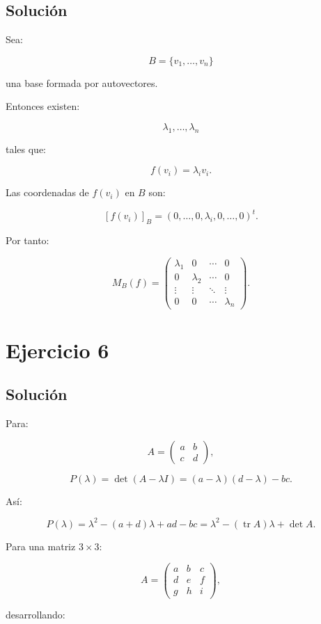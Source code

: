 \documentclass[11pt,a4paper]{article}
\newcommand{\tr}{\operatorname{tr}}
\begin{document}
\subsection{Solución}

Sea:

\[
B=\{v_1,\ldots,v_n\}
\]

una base formada por autovectores.

Entonces existen:

\[
\lambda_1,\ldots,\lambda_n
\]

tales que:

\[
f(v_i)=\lambda_i v_i.
\]

Las coordenadas de $f(v_i)$ en $B$ son:

\[
[f(v_i)]_B
=
(0,\ldots,0,\lambda_i,0,\ldots,0)^t.
\]

Por tanto:

\[
\boxed{
M_B(f)
=
\begin{pmatrix}
\lambda_1&0&\cdots&0\\
0&\lambda_2&\cdots&0\\
\vdots&\vdots&\ddots&\vdots\\
0&0&\cdots&\lambda_n
\end{pmatrix}.
}
\]

\section{Ejercicio 6}
\subsection{Solución}

Para:

\[
A=
\begin{pmatrix}
a&b\\
c&d
\end{pmatrix},
\]

\[
P(\lambda)
=
\det(A-\lambda I)
=
(a-\lambda)(d-\lambda)-bc.
\]

Así:

\[
\boxed{
P(\lambda)
=
\lambda^2-(a+d)\lambda+ad-bc
=
\lambda^2-(\tr A)\lambda+\det A.
}
\]

Para una matriz $3\times3$:

\[
A=
\begin{pmatrix}
a&b&c\\
d&e&f\\
g&h&i
\end{pmatrix},
\]

desarrollando:
\end{document}
